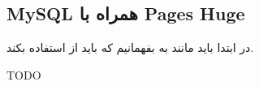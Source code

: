 \subsection{MySQL همراه با Pages Huge}
در ابتدا باید مانند
به
بفهمانیم که باید از
استفاده بکند.

TODO